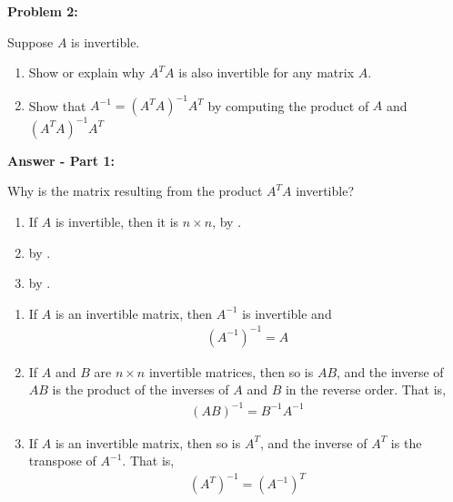 \documentclass[10pt,letterpaper,final]{report}
\begin{document}
\noindent\textbf{Problem 2:}
\medskip

Suppose $A$ is invertible.

\begin{enumerate}
  \item Show or explain why $A^T A$ is also invertible for any matrix $A$.
  \item Show that $A^{-1} = (A^T A)^{-1} A^T$ by computing the product of $A$ and $(A^T A)^{-1} A^T$
\end{enumerate}

\medskip
\noindent\textbf{Answer - Part 1:}
\medskip

Why is the matrix resulting from the product $A^T A$ invertible?

\begin{enumerate}
  \item If $A$ is invertible, then it is $n \times n$, by \autocite[Definition of invertible matrix, p.~111]{LayEtAl2020LinearAlgebraAndItsApplications}.
  \item by \textcite[Theorem 2.6, p.~114]{LayEtAl2020LinearAlgebraAndItsApplications}.
  \item by \textcite[Theorem 2.8(a,l), p.~121]{LayEtAl2020LinearAlgebraAndItsApplications}.
\end{enumerate}

\begin{tcolorbox}[colback=blue!10!white, colframe=blue!10!black, title=Theorem 2.6 - Invertible Matrices]
  \begin{enumerate}[label=\alph*.]
    \item If $A$ is an invertible matrix, then $A^{-1}$ is invertible and
          \begin{align*}
            (A^{-1})^{-1} = A
          \end{align*}
    \item If $A$ and $B$ are $n \times n$ invertible matrices, then so is $AB$, and the inverse of $AB$ is the product of the inverses of $A$ and $B$ in the reverse order. That is,
          \begin{align*}
            (AB)^{-1} = B^{-1}A^{-1}
          \end{align*}
    \item If $A$ is an invertible matrix, then so is $A^T$, and the inverse of $A^T$ is the transpose of $A^{-1}$. That is,
          \begin{align*}
            (A^T)^{-1} = (A^{-1})^T
          \end{align*}
  \end{enumerate}
\end{tcolorbox}
\end{document}
